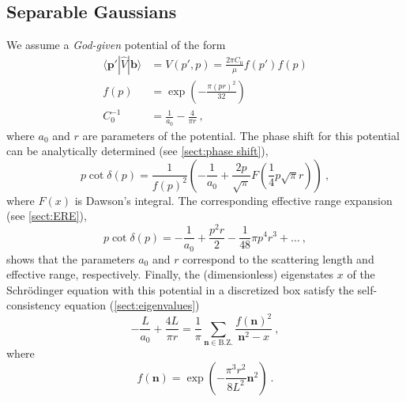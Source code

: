 \documentclass[11pt]{article}
\begin{document}
\subsection{Separable Gaussians}

We assume a \emph{God-given} potential of the form
\begin{align}
\langle \bm p'|\hat V|\bm b\rangle &=V(p',p)= \frac{2\pi C_0}{\mu}f(p')f(p)\label{eqn:god potential}\\
f(p)&=\exp\left(-\frac{\pi (pr)^2}{32}\right)\nonumber\\
C_0^{-1}&=\frac{1}{a_0}-\frac{4}{\pi  r}\nonumber\ ,
\end{align}
where $a_0$ and $r$ are parameters of the potential.
The phase shift for this potential can be analytically determined (see \autoref{sect:phase shift}), 
\begin{equation}
p\cot\delta(p)=\frac{1}{f(p)^2}\left(-\frac{1}{a_0}+\frac{2 p}{\sqrt{\pi}} F\left(\frac{1}{4} p \sqrt{\pi } r\right)\right)\ ,
\end{equation}
where $F(x)$ is Dawson's integral.  The corresponding effective range expansion (see \autoref{sect:ERE}),
\begin{equation}
p\cot\delta(p)=-\frac{1}{a_0}+\frac{p^2 r}{2}-\frac{1}{48} \pi  p^4 r^3+\ldots\ ,
\end{equation}
shows that the parameters $a_0$ and $r$ correspond to the scattering length and effective range, respectively.  Finally, the (dimensionless) eigenstates $x$ of the Schr\"odinger equation with this potential in a discretized box satisfy the self-consistency equation (\autoref{sect:eigenvalues})
\begin{equation}\label{eqn:SE}
-\frac{L}{a_0}+\frac{4L}{\pi  r}=\frac{1}{\pi}\sum_{\bm n\in\mathrm{B.Z.}}\frac{f\left(\bm n\right)^2}{\bm n^2-x}\ ,
\end{equation}
where
\begin{equation}
f(\bm n)=\exp\left(-\frac{\pi ^3  r^2}{8 L^2}\bm n^2\right)\ .
\end{equation}
\end{document}
